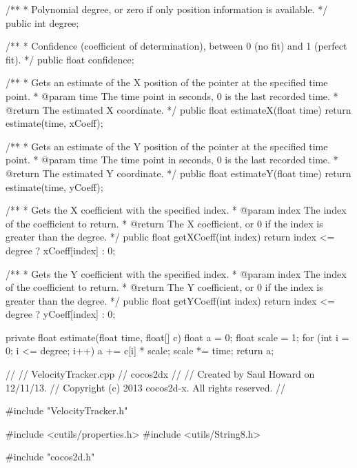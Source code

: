 {{        /**
         * Polynomial degree, or zero if only position information is available.
         */
        public int degree;

        /**
         * Confidence (coefficient of determination), between 0 (no fit) and 1 (perfect fit).
         */
        public float confidence;

        /**
         * Gets an estimate of the X position of the pointer at the specified time point.
         * @param time The time point in seconds, 0 is the last recorded time.
         * @return The estimated X coordinate.
         */
        public float estimateX(float time) {
            return estimate(time, xCoeff);
        }

        /**
         * Gets an estimate of the Y position of the pointer at the specified time point.
         * @param time The time point in seconds, 0 is the last recorded time.
         * @return The estimated Y coordinate.
         */
        public float estimateY(float time) {
            return estimate(time, yCoeff);
        }

        /**
         * Gets the X coefficient with the specified index.
         * @param index The index of the coefficient to return.
         * @return The X coefficient, or 0 if the index is greater than the degree.
         */
        public float getXCoeff(int index) {
            return index <= degree ? xCoeff[index] : 0;
        }

        /**
         * Gets the Y coefficient with the specified index.
         * @param index The index of the coefficient to return.
         * @return The Y coefficient, or 0 if the index is greater than the degree.
         */
        public float getYCoeff(int index) {
            return index <= degree ? yCoeff[index] : 0;
        }

        private float estimate(float time, float[] c) {
            float a = 0;
            float scale = 1;
            for (int i = 0; i <= degree; i++) {
                a += c[i] * scale;
                scale *= time;
            }
            return a;
        }
    }
}

//
//  VelocityTracker.cpp
//  cocos2dx
//
//  Created by Saul Howard on 12/11/13.
//  Copyright (c) 2013 cocos2d-x. All rights reserved.
//

#include "VelocityTracker.h"

#include <cutils/properties.h>
#include <utils/String8.h>

#include "cocos2d.h"

